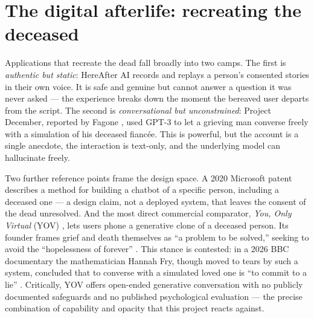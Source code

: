 \documentclass[11pt,a4paper]{report}
\begin{document}
\section{The digital afterlife: recreating the deceased}
Applications that recreate the dead fall broadly into two camps. The first is \emph{authentic but static}: HereAfter AI \cite{hereafter} records and replays a person's consented stories in their own voice. It is safe and genuine but cannot answer a question it was never asked --- the experience breaks down the moment the bereaved user departs from the script. The second is \emph{conversational but unconstrained}: Project December, reported by Fagone \cite{fagone2021jessica}, used GPT-3 to let a grieving man converse freely with a simulation of his deceased fiancée. This is powerful, but the account is a single anecdote, the interaction is text-only, and the underlying model can hallucinate freely.

Two further reference points frame the design space. A 2020 Microsoft patent \cite{abramson2020patent} describes a method for building a chatbot of a specific person, including a deceased one --- a design claim, not a deployed system, that leaves the consent of the dead unresolved. And the most direct commercial comparator, \emph{You, Only Virtual} (YOV) \cite{yov}, lets users phone a generative clone of a deceased person. Its founder frames grief and death themselves as ``a problem to be solved,'' seeking to avoid the ``hopelessness of forever'' \cite{fry2026aiconfidential}. This stance is contested: in a 2026 BBC documentary the mathematician Hannah Fry, though moved to tears by such a system, concluded that to converse with a simulated loved one is ``to commit to a lie'' \cite{fry2026aiconfidential}. Critically, YOV offers open-ended generative conversation with no publicly documented safeguards and no published psychological evaluation --- the precise combination of capability and opacity that this project reacts against.
\end{document}
